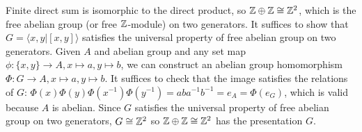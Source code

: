\documentclass[12pt]{article}
\begin{document}
\begin{problem}[15]
	Finite direct sum is isomorphic to the direct product, so $ \mathbb{Z} \oplus \mathbb{Z} \cong \mathbb{Z}^2$, which is the free abelian group (or free $ \mathbb{Z}$-module) on two generators. It suffices to show that $ G= \langle x,y| [x,y] \rangle$ satisfies the universal property of free abelian group on two generators. Given $ A$ and abelian group and any set map  $ \phi: \{x,y\} \to A, x \mapsto a, y \mapsto b$, we can construct an abelian group homomorphism $ \Phi: G \to A, x\mapsto a, y \mapsto b$. It suffices to check that the image satisfies the relations of $ G$:  $\Phi(x)\Phi(y)\Phi(x^{-1})\Phi(y^{-1}) = aba^{-1}b^{-1} = e_A= \Phi(e_G)$, which is valid because $ A$ is abelian. Since  $ G$ satisfies the universal property of free abelian group on two generators,  $ G \cong \mathbb{Z}^2$ so $ \mathbb{Z} \oplus \mathbb{Z} \cong \mathbb{Z}^2$ has the presentation $ G$.
\end{problem}
\end{document}
